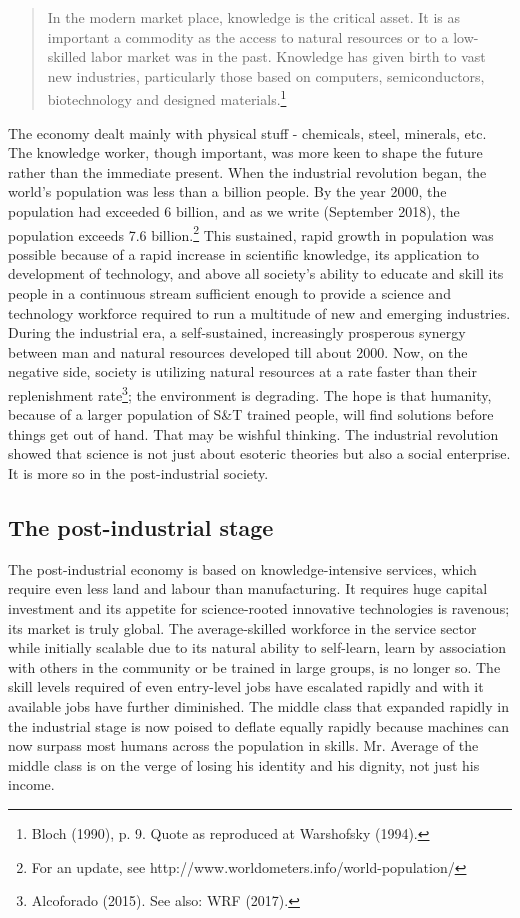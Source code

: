 \begin{multicols}{2}
\begin{quote}
In the modern market place, knowledge is the critical asset. It is as important a commodity as the access to natural resources or to a low-skilled labor market was in the past. Knowledge has given birth to vast new industries, particularly those based on computers, semiconductors, biotechnology and designed materials.\footnote{Bloch (1990), p. 9. Quote as reproduced at Warshofsky (1994).}
\end{quote}

The economy dealt mainly with physical stuff - chemicals, steel, minerals, etc. The knowledge worker, though important, was more keen to shape the future rather than the immediate present. When the industrial revolution began, the world's population was less than a billion people. By the year 2000, the population had exceeded 6 billion, and as we write (September 2018), the population exceeds 7.6 billion.\footnote{For an update, see http://www.worldometers.info/world-population/} This sustained, rapid growth in population was possible because of a rapid increase in scientific knowledge, its application to development of technology, and above all society's ability to educate and skill its people in a continuous stream sufficient enough to provide a science and technology workforce required to run a multitude of new and emerging industries. During the industrial era, a self-sustained, increasingly prosperous synergy between man and natural resources developed till about 2000. Now, on the negative side, society is utilizing natural resources at a rate faster than their replenishment rate\footnote{Alcoforado (2015). See also: WRF (2017).}; the environment is degrading. The hope is that humanity, because of a larger population of S\&T trained people, will find solutions before things get out of hand. That may be wishful thinking. The industrial revolution showed that science is not just about esoteric theories but also a social enterprise. It is more so in the post-industrial society.

\subsection{The post-industrial stage}

The post-industrial economy is based on knowledge-intensive services, which require even less land and labour than manufacturing. It requires huge capital investment and its appetite for science-rooted innovative technologies is ravenous; its market is truly global. The average-skilled workforce in the service sector while initially scalable due to its natural ability to self-learn, learn by association with others in the community or be trained in large groups, is no longer so. The skill levels required of even entry-level jobs have escalated rapidly and with it available jobs have further diminished. The middle class that expanded rapidly in the industrial stage is now poised to deflate equally rapidly because machines can now surpass most humans across the population in skills. Mr. Average of the middle class is on the verge of losing his identity and his dignity, not just his income.


\end{multicols}
